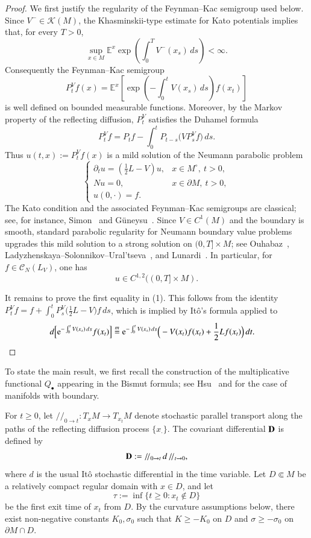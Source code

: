 \documentclass[11pt,twoside, reqno]{article}
\def\e{{\rm e}}
\newcommand\1{\mathbbm{1}}
\theoremstyle{definition}
\numberwithin{equation}{section}
\def \e{{\rm e}}
\begin{document}
\begin{proof}
We first justify the regularity of the Feynman--Kac semigroup used below.
Since \(V^-\in \mathcal K(M)\), the Khasminskii-type estimate for Kato
potentials implies that, for every \(T>0\),
\[
 \sup_{x\in M}\mathbb E^x\exp\left(\int_0^T V^-(x_s)\,ds\right)<\infty .
\]
Consequently the Feynman--Kac semigroup
\[
 P_t^V f(x)
 =
 \mathbb E^x\left[
 \exp\left(-\int_0^t V(x_s)\,ds\right)f(x_t)
 \right]
\]
is well defined on bounded measurable functions. Moreover, by the Markov
property of the reflecting diffusion, \(P_t^V\) satisfies the Duhamel formula
\[
 P_t^V f
 =
 P_t f
 -
 \int_0^t P_{t-s}\big(VP_s^Vf\big)\,ds .
\]
Thus \(u(t,x):=P_t^Vf(x)\) is a mild solution of the Neumann parabolic
problem
\[
\begin{cases}
 \partial_t u=\left(\frac12L-V\right)u, & x\in M^\circ,\ t>0,\\
 Nu=0, & x\in \partial M,\ t>0,\\
 u(0,\cdot)=f.
\end{cases}
\]
The Kato condition and the associated Feynman--Kac semigroups are classical;
see, for instance, Simon~\cite{Simon} and G{\"u}neysu~\cite{Gu2017}.
Since \(V\in C^1(M)\) and the boundary is smooth, standard parabolic
regularity for Neumann boundary value problems upgrades this mild solution
to a strong solution on \((0,T]\times M\); see
Ouhabaz~\cite{Ouhabaz2005}, Ladyzhenskaya--Solonnikov--Ural'tseva~\cite{LSU1968},
and Lunardi~\cite{Lunardi1995}. 
In particular, for
\(f\in \mathcal{C}_N(L_V)\), one has
\[
u \in C^{1,2}((0,T]\times M).
\]



It remains to prove the first equality in (1). This follows from the identity \( P_t^V f = f + \int_0^t P_s^V \big(\frac{1}{2}L-V\big) f \, ds \), which is implied by Itô's formula applied to
\begin{align*}
d \Big[\e^{-\int_0^tV(x_s)\, ds}f(x_t)\Big] &\overset{m}{=} \e^{-\int_0^tV(x_s)\, ds}\Big(-V(x_t)f(x_t)+\frac{1}{2}Lf(x_t)\Big)\, dt.
\end{align*}

\end{proof}


To state the main result, we first recall the construction of the multiplicative functional
$Q_{\bullet}$ appearing in the Bismut formula; see 
{Hsu}~\cite{Hsu} and
\cite[Theorem~1.1]{Wbook14} for the case of manifolds with boundary.

For $t\geq0$, let $/\!/_{0\to t}:T_xM\to T_{x_t}M$ denote stochastic
parallel transport along the paths of the reflecting diffusion process
$\{x_{\cdot}\}$. The covariant differential ${\bf D}$ is defined by
\[
        {\bf D}:=/\!/_{0\to t}\,d\,/\!/_{t\to0},
\]
where $d$ is the usual It\^o stochastic differential in the time variable.
Let $D\Subset M$ be a relatively compact regular domain with $x\in D$, and
let
\[
        \tau:=\inf\{t\geq0:x_t\notin D\}
\]
be the first exit time of $x_t$ from $D$. By the curvature assumptions below,
there exist non-negative constants $K_0,\sigma_0$ such that
$K\geq -K_0$ on $D$ and $\sigma\geq-\sigma_0$ on $\partial M\cap D$.
\end{document}
